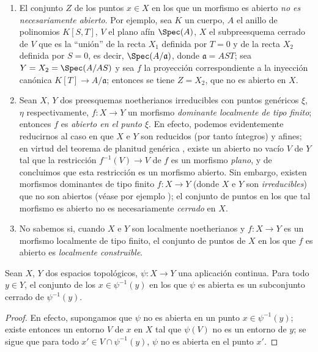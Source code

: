 \begin{remarks}[14.1.3]
\label{IV.14.1.3}
\begin{enumerate}[label=(\roman*)]
  \item El conjunto $Z$ de los puntos $x\in X$ en los que un morfismo es abierto \emph{no es necesariamente abierto}.
  Por ejemplo, sea $K$ un cuerpo, $A$ el anillo de polinomios $K[S,T]$, $V$ el plano afín $\Spec(A)$, $X$ el subpreesquema cerrado de $V$ que es la ``unión'' de la recta $X_1$ definida por $T=0$ y de la recta $X_2$ definida por $S=0$, es decir, $\Spec(A/\mathfrak{a})$, donde $\mathfrak{a}=AST$; sea $Y=X_2=\Spec(A/AS)$ y sea $f$ la proyección correspondiente a la inyección canónica $K[T]\to A/\mathfrak{a}$; entonces se tiene $Z=X_2$, que no es abierto en $X$.

  \item Sean $X$, $Y$ dos preesquemas noetherianos irreducibles con puntos genéricos $\xi$, $\eta$ respectivamente, $f:X\to Y$ un morfismo \emph{dominante localmente de tipo finito}; entonces $f$ es \emph{abierto en el punto $\xi$}.
  En efecto, podemos evidentemente reducirnos al caso en que $X$ e $Y$ son reducidos (por tanto íntegros)  y afines; en virtud del teorema de planitud genérica , existe un abierto no vacío $V$ de $Y$ tal que la restricción $f^{-1}(V)\to V$ de $f$ es un morfismo \emph{plano}, y de  concluimos que esta restricción es un morfismo abierto.
  Sin embargo, existen morfismos dominantes de tipo finito $f:X\to Y$ (donde $X$ e $Y$ son \emph{irreducibles}) que no son abiertos (véase por ejemplo ); el conjunto de puntos en los que tal morfismo es abierto no es necesariamente \emph{cerrado} en $X$.

  \item No sabemos si, cuando $X$ e $Y$ son localmente noetherianos y $f:X\to Y$ es un morfismo localmente de tipo finito, el conjunto de puntos de $X$ en los que $f$ es abierto es \emph{localmente construible}.
\end{enumerate}
\end{remarks}

\begin{proposition}[14.1.4]
\label{IV.14.1.4}
Sean $X$, $Y$ dos espacios topológicos, $\psi:X\to Y$ una aplicación continua.
Para todo $y\in Y$, el conjunto de los $x\in\psi^{-1}(y)$ en los que $\psi$ es abierta es un subconjunto cerrado de $\psi^{-1}(y)$.
\end{proposition}

\begin{proof}
En efecto, supongamos que $\psi$ no es abierta en un punto $x\in\psi^{-1}(y)$; existe entonces un entorno $V$ de $x$ en $X$ tal que $\psi(V)$ no es un entorno de $y$; se sigue que para todo $x'\in V\cap\psi^{-1}(y)$, $\psi$ no es abierta en el punto $x'$.
\end{proof}


